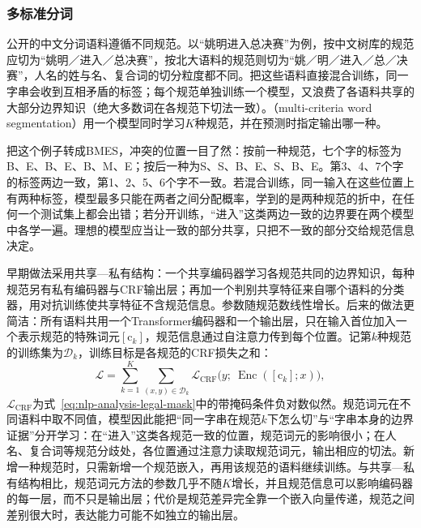 \subsubsection{多标准分词}
\label{sec:nlp-analysis-multi-criteria}

公开的中文分词语料遵循不同规范。以“姚明进入总决赛”为例，按中文树库的规范应切为“姚明／进入／总决赛”，按北大语料的规范则切为“姚／明／进入／总／决赛”，人名的姓与名、复合词的切分粒度都不同。把这些语料直接混合训练，同一字串会收到互相矛盾的标签；每个规范单独训练一个模型，又浪费了各语料共享的大部分边界知识（绝大多数词在各规范下切法一致）。（multi-criteria word segmentation）用一个模型同时学习$K$种规范，并在预测时指定输出哪一种。

把这个例子转成BMES，冲突的位置一目了然：按前一种规范，七个字的标签为B、E、B、E、B、M、E；按后一种为S、S、B、E、S、B、E。第3、4、7个字的标签两边一致，第1、2、5、6个字不一致。若混合训练，同一输入在这些位置上有两种标签，模型最多只能在两者之间分配概率，学到的是两种规范的折中，在任何一个测试集上都会出错；若分开训练，“进入”这类两边一致的边界要在两个模型中各学一遍。理想的模型应当让一致的部分共享，只把不一致的部分交给规范信息决定。

早期做法采用共享—私有结构：一个共享编码器学习各规范共同的边界知识，每种规范另有私有编码器与CRF输出层；再加一个判别共享特征来自哪个语料的分类器，用对抗训练使共享特征不含规范信息。参数随规范数线性增长。后来的做法更简洁：所有语料共用一个Transformer编码器和一个输出层，只在输入首位加入一个表示规范的特殊词元$[\mathrm{c}_k]$，规范信息通过自注意力传到每个位置。记第$k$种规范的训练集为$\mathcal D_k$，训练目标是各规范的CRF损失之和：
\begin{equation}
  \mathcal L=\sum_{k=1}^{K}\sum_{(x,y)\in\mathcal D_k}
  \mathcal L_{\mathrm{CRF}}\bigl(y;\ \operatorname{Enc}([\mathrm c_k];x)\bigr),
  \label{eq:nlp-analysis-multi-criteria}
\end{equation}
$\mathcal L_{\mathrm{CRF}}$为式~\eqref{eq:nlp-analysis-legal-mask}中的带掩码条件负对数似然。规范词元在不同语料中取不同值，模型因此能把“同一字串在规范$k$下怎么切”与“字串本身的边界证据”分开学习：在“进入”这类各规范一致的位置，规范词元的影响很小；在人名、复合词等规范分歧处，各位置通过注意力读取规范词元，输出相应的切法。新增一种规范时，只需新增一个规范嵌入，再用该规范的语料继续训练。与共享—私有结构相比，规范词元方法的参数几乎不随$K$增长，并且规范信息可以影响编码器的每一层，而不只是输出层；代价是规范差异完全靠一个嵌入向量传递，规范之间差别很大时，表达能力可能不如独立的输出层。

